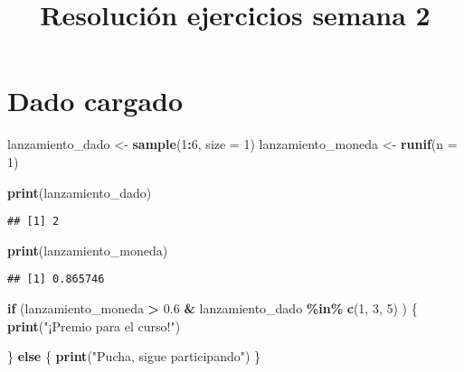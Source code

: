 \documentclass[
]{article}
\title{Resolución ejercicios semana 2}
\author{}
\date{\vspace{-2.5em}}
\newenvironment{Shaded}{\begin{snugshade}}{\end{snugshade}}
\newcommand{\AttributeTok}[1]{\textcolor[rgb]{0.13,0.29,0.53}{#1}}
\newcommand{\ControlFlowTok}[1]{\textcolor[rgb]{0.13,0.29,0.53}{\textbf{#1}}}
\newcommand{\DecValTok}[1]{\textcolor[rgb]{0.00,0.00,0.81}{#1}}
\newcommand{\FloatTok}[1]{\textcolor[rgb]{0.00,0.00,0.81}{#1}}
\newcommand{\FunctionTok}[1]{\textcolor[rgb]{0.13,0.29,0.53}{\textbf{#1}}}
\newcommand{\NormalTok}[1]{#1}
\newcommand{\OtherTok}[1]{\textcolor[rgb]{0.56,0.35,0.01}{#1}}
\newcommand{\SpecialCharTok}[1]{\textcolor[rgb]{0.81,0.36,0.00}{\textbf{#1}}}
\newcommand{\StringTok}[1]{\textcolor[rgb]{0.31,0.60,0.02}{#1}}
\begin{document}
\maketitle

\hypertarget{dado-cargado}{%
\section{Dado cargado}\label{dado-cargado}}

\begin{Shaded}
\begin{Highlighting}[]
\NormalTok{lanzamiento\_dado }\OtherTok{\textless{}{-}} \FunctionTok{sample}\NormalTok{(}\DecValTok{1}\SpecialCharTok{:}\DecValTok{6}\NormalTok{, }\AttributeTok{size =} \DecValTok{1}\NormalTok{)}
\NormalTok{lanzamiento\_moneda }\OtherTok{\textless{}{-}} \FunctionTok{runif}\NormalTok{(}\AttributeTok{n =} \DecValTok{1}\NormalTok{)}

\FunctionTok{print}\NormalTok{(lanzamiento\_dado)}
\end{Highlighting}
\end{Shaded}

\begin{verbatim}
## [1] 2
\end{verbatim}

\begin{Shaded}
\begin{Highlighting}[]
\FunctionTok{print}\NormalTok{(lanzamiento\_moneda)}
\end{Highlighting}
\end{Shaded}

\begin{verbatim}
## [1] 0.865746
\end{verbatim}

\begin{Shaded}
\begin{Highlighting}[]
\ControlFlowTok{if}\NormalTok{ (lanzamiento\_moneda }\SpecialCharTok{\textgreater{}} \FloatTok{0.6} \SpecialCharTok{\&}\NormalTok{ lanzamiento\_dado }\SpecialCharTok{\%in\%} \FunctionTok{c}\NormalTok{(}\DecValTok{1}\NormalTok{, }\DecValTok{3}\NormalTok{, }\DecValTok{5}\NormalTok{)  ) \{}
  \FunctionTok{print}\NormalTok{(}\StringTok{"¡Premio para el curso!"}\NormalTok{)  }
  
\NormalTok{\} }\ControlFlowTok{else}\NormalTok{ \{}
  \FunctionTok{print}\NormalTok{(}\StringTok{"Pucha, sigue participando"}\NormalTok{)}
\NormalTok{\}}
\end{Highlighting}
\end{Shaded}
\end{document}
